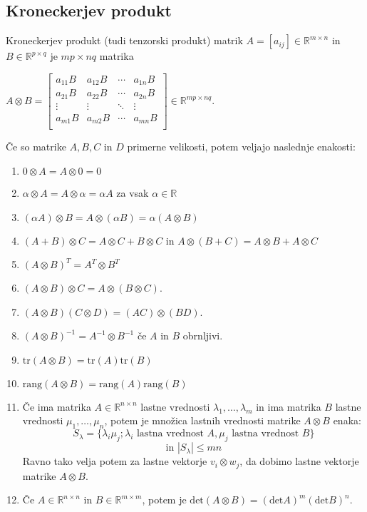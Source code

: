 \documentclass{article}
\begin{document}
\begin{multicols}{2}
	\subsection{Kroneckerjev produkt}

	Kroneckerjev produkt (tudi tenzorski produkt) matrik \( A = [a_{ij}] \in \mathbb{R}^{m \times n} \) in \( B \in \mathbb{R}^{p \times q} \) je \( mp \times nq \) matrika

	\begin{math}
		A \otimes B =
		\begin{bmatrix}
			a_{11}B & a_{12}B & \cdots & a_{1n}B \\
			a_{21}B & a_{22}B & \cdots & a_{2n}B \\
			\vdots  & \vdots  & \ddots & \vdots  \\
			a_{m1}B & a_{m2}B & \cdots & a_{mn}B \\
		\end{bmatrix}
		\in \mathbb{R}^{mp \times nq}.
	\end{math}

	Če so matrike $A, B, C$ in $D$ primerne velikosti, potem veljajo naslednje enakosti:
	\begin{enumerate}
		\item $0 \otimes A = A \otimes 0 = 0$
		\item $\alpha \otimes A = A \otimes \alpha = \alpha A$ za vsak $\alpha \in \mathbb{R}$
		\item $(\alpha A) \otimes B = A \otimes (\alpha B) = \alpha (A \otimes B)$
		\item $(A + B) \otimes C = A \otimes C + B \otimes C$ in $A \otimes (B + C) = A \otimes B + A \otimes C$
		\item $(A \otimes B)^T = A^T \otimes B^T$
		\item $(A \otimes B) \otimes C = A \otimes (B \otimes C)$.
		\item $(A \otimes B)(C \otimes D) = (AC) \otimes (BD)$.
		\item $(A \otimes B)^{-1} = A^{-1} \otimes B^{-1}$ če $A$ in $B$ obrnljivi.
		\item $\text{tr}(A \otimes B) = \text{tr}(A) \text{tr}(B)$
		\item $\text{rang}(A \otimes B) = \text{rang}(A) \text{rang}(B)$
		\item Če ima matrika $A \in \mathbb{R}^{n \times n}$ lastne vrednosti $\lambda_1, \ldots, \lambda_m$ in ima matrika $B$ lastne vrednosti $\mu_1, \ldots, \mu_n$, potem je množica lastnih vrednosti matrike $A \otimes B$ enaka:
		      $$ S_\lambda  = \{ \lambda_i \mu_j; \lambda_i \text{ lastna vrednost } A, \mu_j \text{ lastna vrednost } B\} $$
		      $$\text{in } |S_\lambda| \leq mn$$
		      Ravno tako velja potem za lastne vektorje $ v_i \otimes w_j$, da dobimo lastne vektorje matrike $A \otimes B$.
		\item Če $A \in \mathbb{R}^{n \times n}$ in $B \in \mathbb{R}^{m \times m}$, potem je $\text{det}(A \otimes B) = (\text{det} A)^m(\text{det} B)^n.$
	\end{enumerate}


\end{multicols}
\end{document}
